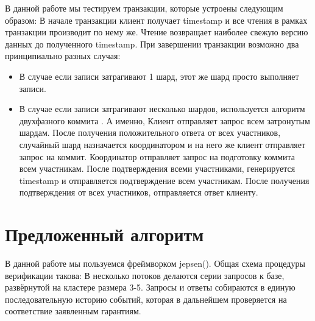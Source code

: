\documentclass[pdftex,ptm,14pt,a4paper]{extreport}
\theoremstyle{definition}
\begin{document}
В данной работе мы тестируем транзакции, которые устроены следующим образом:
В начале транзакции клиент получает timestamp и все чтения в рамках транзакции
производит по нему же. Чтение возвращает наиболее свежую версию данных до полученного
timestamp. При завершении транзакции возможно два принципиально разных случая:
\begin{itemize}
    \item В случае если записи затрагивают 1 шард, этот же шард просто выполняет записи.
    \item В случае если записи затрагивают несколько шардов, используется алгоритм
        двухфазного коммита \cite{tanenbaum2007distributed}.
        А именно,
        \subitem Клиент отправляет запрос всем затронутым шардам.
        \subitem После получения положительного ответа от всех участников,
            случайный шард назначается координатором и на него же клиент отправляет
            запрос на коммит.
        \subitem Координатор отправляет запрос на подготовку коммита всем участникам.
        \subitem После подтверждения всеми участниками, генерируется timestamp и
            отправляется подтверждение всем участникам.
        \subitem После получения подтверждения от всех участников, отправляется ответ клиенту.
\end{itemize}

\chapter{Предложенный алгоритм}
В данной работе мы пользуемся фреймворком jepsen(\cite{jepsen-io}).
Общая схема процедуры верификации такова:
В несколько потоков делаются серии запросов к базе, развёрнутой на кластере размера 3-5.
Запросы и ответы собираются в единую последовательную историю событий, которая в дальнейшем
 проверяется на соответствие заявленным гарантиям.
\end{document}
